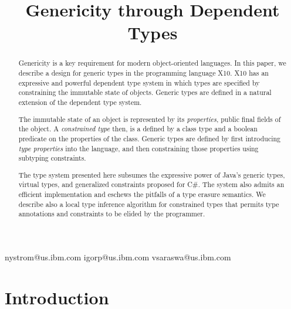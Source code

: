 \documentclass[preprint,nocopyrightspace,9pt]{sigplanconf}
\newif\iflncs
\begin{document}
\title{Genericity through Dependent Types}

\iflncs

\author{
Nathaniel Nystom\inst{1}
\and
Igor Peshansky\inst{1}
\and
Vijay Saraswat\inst{1}
}

\institute{IBM T.~J. Watson Research~Center, P.O.~Box~704, Yorktown~Heights NY 10598 USA,
\email{\{nystrom,vsaraswa\}@us.ibm.com}}

\else

  {nystrom@us.ibm.com}
  {igorp@us.ibm.com}
  {vsaraswa@us.ibm.com}


\fi

\maketitle

\begin{abstract}
Genericity is a key requirement for modern object-oriented languages.
In this paper, we describe a design for generic types in
the programming language X10.
X10 has an expressive and powerful dependent type system
in which types are specified by constraining the immutable state
of objects.  Generic types are defined
in a natural extension of the
dependent type system.


The immutable state of an object is represented by its
\emph{properties}, public final fields of the object.
A \emph{constrained type} then, is a defined by a class type and
a boolean predicate on the properties of the class.
Generic types are defined by first introducing \emph{type properties} into
the language, and then constraining those properties using
subtyping constraints.

The type system presented  here  subsumes the expressive power
of Java's generic types, virtual types,
and generalized constraints proposed for C\#.
The system also admits an efficient implementation
and eschews the pitfalls of a type erasure semantics.
We describe also a local type inference algorithm for constrained
types that permits type annotations and constraints to be elided
by the programmer.
\end{abstract}

\section{Introduction}
\end{document}
